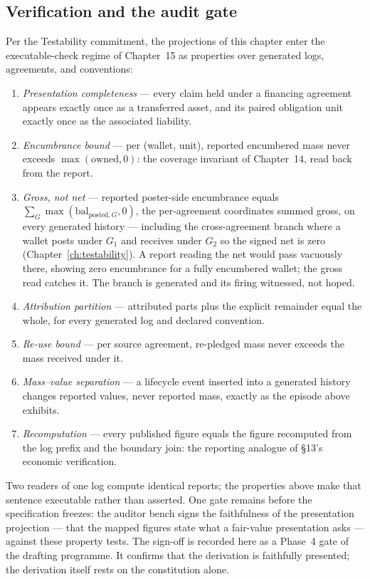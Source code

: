 \documentclass[11pt,a4paper]{article}
\begin{document}
\subsection{Verification and the audit gate}

Per the Testability commitment, the projections of this chapter enter the
executable-check regime of Chapter~15 as properties over generated logs,
agreements, and conventions:

\begin{enumerate}[nosep]
\item \emph{Presentation completeness} --- every claim held under a financing
  agreement appears exactly once as a transferred asset, and its paired
  obligation unit exactly once as the associated liability.
\item \emph{Encumbrance bound} --- per (wallet, unit), reported encumbered mass
  never exceeds $\max(\text{owned}, 0)$: the coverage invariant of Chapter~14,
  read back from the report.
\item \emph{Gross, not net} --- reported poster-side encumbrance equals
  $\sum_G \max(\mathrm{bal}_{\text{posted},G}, 0)$, the per-agreement coordinates
  summed gross, on every generated history --- including the cross-agreement branch
  where a wallet posts under $G_1$ and receives under $G_2$ so the signed net is
  zero (Chapter~\ref{ch:testability}). A report reading the net would pass vacuously
  there, showing zero encumbrance for a fully encumbered wallet; the gross read
  catches it. The branch is generated and its firing witnessed, not hoped.
\item \emph{Attribution partition} --- attributed parts plus the explicit
  remainder equal the whole, for every generated log and declared convention.
\item \emph{Re-use bound} --- per source agreement, re-pledged mass never
  exceeds the mass received under it.
\item \emph{Mass--value separation} --- a lifecycle event inserted into a
  generated history changes reported values, never reported mass, exactly as
  the episode above exhibits.
\item \emph{Recomputation} --- every published figure equals the figure
  recomputed from the log prefix and the boundary join: the reporting analogue
  of \S 13's economic verification.
\end{enumerate}

Two readers of one log compute identical reports; the properties above make
that sentence executable rather than asserted. One gate remains before the
specification freezes: the auditor bench signs the faithfulness of the
presentation projection --- that the mapped figures state what a fair-value
presentation asks --- against these property tests. The sign-off is recorded
here as a Phase~4 gate of the drafting programme. It confirms that the
derivation is faithfully presented; the derivation itself rests on the
constitution alone.
\end{document}
